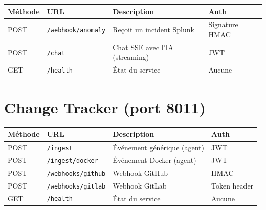 \begin{longtable}{llp{5cm}p{3cm}}
\toprule
\textbf{Méthode} & \textbf{URL} & \textbf{Description} & \textbf{Auth} \\
\midrule
\endhead
\bottomrule
\endfoot
POST & \texttt{/webhook/anomaly} & Reçoit un incident Splunk & Signature HMAC \\
POST & \texttt{/chat}            & Chat SSE avec l'IA (streaming) & JWT \\
GET  & \texttt{/health}          & État du service & Aucune \\
\end{longtable}

\section{Change Tracker (port 8011)}

\begin{longtable}{llp{5cm}p{3cm}}
\toprule
\textbf{Méthode} & \textbf{URL} & \textbf{Description} & \textbf{Auth} \\
\midrule
\endhead
\bottomrule
\endfoot
POST & \texttt{/ingest}              & Événement générique (agent) & JWT \\
POST & \texttt{/ingest/docker}       & Événement Docker (agent)    & JWT \\
POST & \texttt{/webhooks/github}     & Webhook GitHub              & HMAC \\
POST & \texttt{/webhooks/gitlab}     & Webhook GitLab              & Token header \\
GET  & \texttt{/health}              & État du service             & Aucune \\
\end{longtable}
